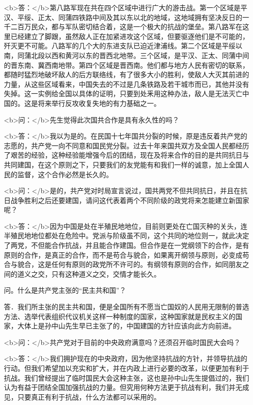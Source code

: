 <b>答：</b>第八路军现在共在四个区域中进行广大的游击战。第一个区域是平汉、平绥、正太、同蒲四铁路中间及其以东以北的地域，这地域拥有坚决反日的一千二百万民众，都与军队密切结合着，这是一个极大的抗战的堡垒。第八路军在这里已经建立了脚跟，虽然敌人正在加紧进攻这个区域，但要驱逐他们是不可能的，歼灭更不可能。八路军的几个大的东进支队已迫近津浦线。第二个区域是平绥以南，同蒲北段以西和黄河以东的晋西北地带。三个区域，是平汉、正太、同蒲中间的晋东南、冀西南地带。第四个区域是晋西南。他们都与地方人民有密切的联系，都随时猛烈地破坏敌人的后方联络线，有了很多大小的胜利，使敌人大灭其前进的力量，从这些区域看来，中国失去的不过是几条铁路及若干城市而已，其他并没有失掉。这一实例给全国以具体的证明，只要到处釆用这种办法，敌人是无法灭亡中国的。这是将来举行反攻收复失地的有力基础之一。

<b>问：</b>先生觉得此次国共合作是具有永久性的吗？

<b>答：</b>我以为是的。在民国十七年国共分裂的时候，原是违反着共产党的志愿的，共产党一向不同意和国民党分裂。过去十年来国共双方及全国人民都经历了艰苦的经验，这种经验能增强今后的团结，现在及将来合作的目的是共同抗日与共同建国，在这个原则之下，只要我们的友党能有和我们一样的诚意，加上全国人民的监督，这个合作必然是长久的。

<b>问：</b>是的，共产党对时局宣言说过，国共两党不但共同抗日，并且在抗日战争胜利之后还要建国，请问这代表着两个不同阶级的政党将来怎能建立新国家呢？

<b>答：</b>因为中国是处在半殖民地地位，目前则更处在亡国灭种的关头，连半殖民地地位都处在危险中。党派与阶级虽不同，这个共同的地位则一，就此决定了两党，不但能合作抗战，并且能合作建国。但合作是在一党纲领下的合作，是有原则的合作，是真正的合作，而不是苟合与貌合，如果离开纲领与原则，必变成苟合与貌合，这是任何有原则的政党所不许可的。有纲领有原则的合作，如同朋友之间的道义之交，只有这种道义之交，交情才能长久。

问。什么是共产党主张的“民主共和国”？

答．我们所主张的民主共和国，便是全国所有不愿当亡国奴的人民用无限制的普选方法、选举代表组织代议机关这样一种制度的国家，这种国家就是民权主义的国家，大体上是孙中山先生早已主张了的，中国建国的方针应该向此方向前进。

<b>问：</b>共产党对于目前的中央政府满意吗？还须召开临时国民大会吗？

<b>答：</b>我们拥护现在的中央政府，因为他坚持抗战的方针，并领导抗战的行动。但我们希望加以充实和扩大，并在内政上进行必要的改革，以便更加有利于抗战。我们曾经提出了临时国民大会这种主张，这也是孙中山先生提倡过的，我们认为有益于团结全国加强抗战的力量。但究用何种方法更于抗战有利，我们并无成见，只要真正有利于抗战，什么方法都可以采用的。


